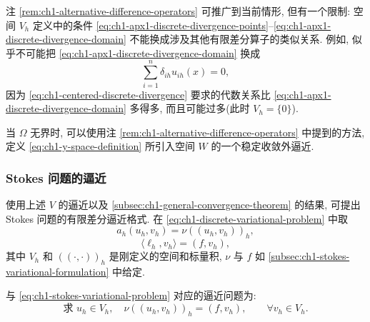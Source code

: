 \begin{Remark}
\label{rem:ch1-apx1-difference-operator-restriction}
注 \ref{rem:ch1-alternative-difference-operators} 可推广到当前情形, 但有一个限制: 空间 $V_h$ 定义中的条件 \eqref{eq:ch1-apx1-discrete-divergence-points}--\eqref{eq:ch1-apx1-discrete-divergence-domain} 不能换成涉及其他有限差分算子的类似关系. 例如, 似乎不可能把 \eqref{eq:ch1-apx1-discrete-divergence-domain} 换成
\begin{equation}
\sum_{i=1}^n\delta_{ih}u_{ih}(x)=0,
\label{eq:ch1-centered-discrete-divergence}
\end{equation}
因为 \eqref{eq:ch1-centered-discrete-divergence} 要求的代数关系比 \eqref{eq:ch1-apx1-discrete-divergence-domain} 多得多, 而且可能过多(此时 $V_h=\{0\}$).
\end{Remark}

\begin{Remark}
\label{rem:ch1-apx1-unbounded-domain}
当 $\Omega$ 无界时, 可以使用注 \ref{rem:ch1-alternative-difference-operators} 中提到的方法, 定义 \eqref{eq:ch1-y-space-definition} 所引入空间 $W$ 的一个稳定收敛外逼近.
\end{Remark}

\subsubsection{Stokes 问题的逼近}
\label{subsubsec:ch1-stokes-finite-difference-scheme}

使用上述 $V$ 的逼近以及 \ref{subsec:ch1-general-convergence-theorem} 的结果, 可提出 Stokes 问题的有限差分逼近格式. 在 \eqref{eq:ch1-discrete-variational-problem} 中取
\begin{equation}
a_h(u_h,v_h)=\nu((u_h,v_h))_h,
\label{eq:ch1-stokes-discrete-bilinear-form}
\end{equation}
\begin{equation}
\langle\ell_h,v_h\rangle=(f,v_h),
\label{eq:ch1-stokes-discrete-linear-form}
\end{equation}
其中 $V_h$ 和 $((\cdot,\cdot))_h$ 是刚定义的空间和标量积, $\nu$ 与 $f$ 如 \ref{subsec:ch1-stokes-variational-formulation} 中给定.

与 \eqref{eq:ch1-stokes-variational-problem} 对应的逼近问题为:
\begin{equation}
\text{求 }u_h\in V_h,\quad
\nu((u_h,v_h))_h=(f,v_h),\qquad\forall v_h\in V_h.
\label{eq:ch1-stokes-finite-difference-problem}
\end{equation}

